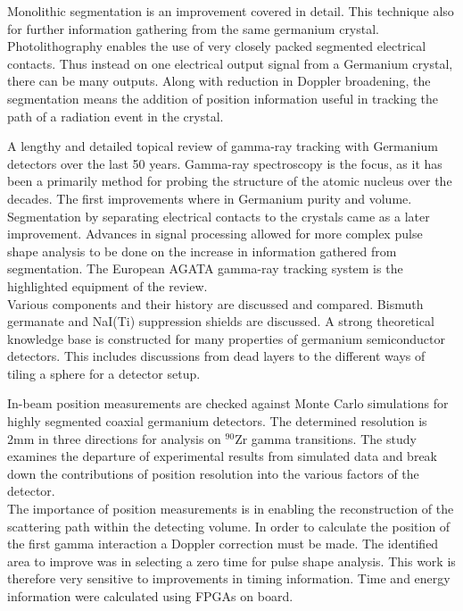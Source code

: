 \documentclass[12pt]{article}
\begin{document}
\begin{doublespacing}
Monolithic segmentation is an improvement covered in detail.
This technique also for further information gathering from the same germanium crystal.
Photolithography enables the use of very closely packed segmented electrical contacts.
Thus instead on one electrical output signal from a Germanium crystal, there can be many outputs.
Along with reduction in Doppler broadening, the segmentation means the addition of position information useful in tracking the path of a radiation event in the crystal.


\textbf{\cite{Eberth2008283}}
A lengthy and detailed topical review of gamma-ray tracking with Germanium detectors over the last 50 years.
Gamma-ray spectroscopy is the focus, as it has been a primarily method for probing the structure of the atomic nucleus over the decades.
The first improvements where in Germanium purity and volume.
Segmentation by separating electrical contacts to the crystals came as a later improvement.
Advances in signal processing allowed for more complex pulse shape analysis to be done on the increase in information gathered from segmentation.
The European AGATA gamma-ray tracking system is the highlighted equipment of the review.
\\

Various components and their history are discussed and compared.
Bismuth germanate and NaI(Ti) suppression shields are discussed.
A strong theoretical knowledge base is constructed for many properties of germanium semiconductor detectors.
This includes discussions from dead layers to the different ways of tiling a sphere for a detector setup.


\textbf{\cite{Descovich2005535}}
In-beam position measurements are checked against Monte Carlo simulations for highly segmented coaxial germanium detectors.
The determined resolution is 2mm in three directions for analysis on $^{90}\mbox{Zr}$ gamma transitions.
The study examines the departure of experimental results from simulated data and break down the contributions of position resolution into the various factors of the detector.
\\

The importance of position measurements is in enabling the reconstruction of the scattering path within the detecting volume.
In order to calculate the position of the first gamma interaction a Doppler correction must be made.
The identified area to improve was in selecting a zero time for pulse shape analysis.
This work is therefore very sensitive to improvements in timing information.
Time and energy information were calculated using FPGAs on board.



\end{doublespacing}
\end{document}
